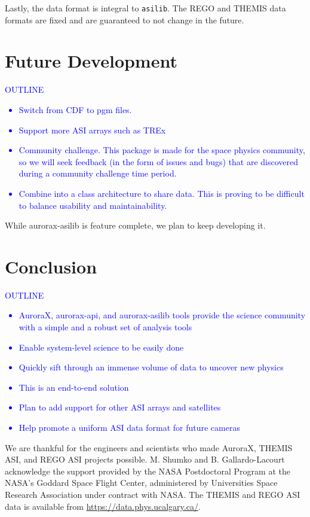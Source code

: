 \documentclass[draft]{agujournal2019}
\begin{document}
Lastly, the data format is integral to \verb|asilib|. The REGO and THEMIS data formats are fixed and are guaranteed to not change in the future.

\section{Future Development}
\textcolor{blue}{
      OUTLINE
      \begin{itemize}
            \item Switch from CDF to pgm files.
            \item Support more ASI arrays such as TREx
            \item Community challenge. This package is made for the space physics community, so we will seek feedback (in the form of issues and bugs) that are discovered during a community challenge time period. 
            \item Combine into a class architecture to share data. This is proving to be difficult to balance usability and maintainability.
      \end{itemize}
}
While aurorax-asilib is feature complete, we plan to keep developing it.

\section{Conclusion}

\textcolor{blue}{
      OUTLINE
      \begin{itemize}
            \item AuroraX, aurorax-api, and aurorax-asilib tools provide the science community with a simple and a robust set of analysis tools
            \item Enable system-level science to be easily done
            \item Quickly sift through an immense volume of data to uncover new physics
            \item This is an end-to-end solution
            \item Plan to add support for other ASI arrays and satellites
            \item Help promote a uniform ASI data format for future cameras
      \end{itemize}
}

\acknowledgments
We are thankful for the engineers and scientists who made AuroraX, THEMIS ASI, and REGO ASI projects possible. M. Shumko and B. Gallardo-Lacourt acknowledge the support provided by the NASA Postdoctoral Program at the NASA’s Goddard Space Flight Center, administered by Universities Space Research Association under contract with NASA. The THEMIS and REGO ASI data is available from \url{https://data.phys.ucalgary.ca/}.

% 
\end{document}
